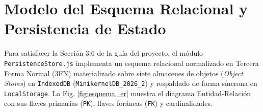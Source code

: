 \documentclass[10pt,twocolumn,letterpaper]{article}
\begin{document}
\section{Modelo del Esquema Relacional y Persistencia de Estado}

Para satisfacer la Secci\'on 3.6 de la gu\'ia del proyecto, el m\'odulo \texttt{PersistenceStore.js} implementa un esquema relacional normalizado en Tercera Forma Normal (3FN) materializado sobre siete almacenes de objetos (\textit{Object Stores}) en \texttt{IndexedDB} (\texttt{MinikernelDB\_2026\_2}) y respaldado de forma s\'incrona en \texttt{LocalStorage}. La Fig. \ref{fig:esquema_er} muestra el diagrama Entidad-Relaci\'on con sus llaves primarias (\texttt{PK}), llaves for\'aneas (\texttt{FK}) y cardinalidades.
\end{document}
